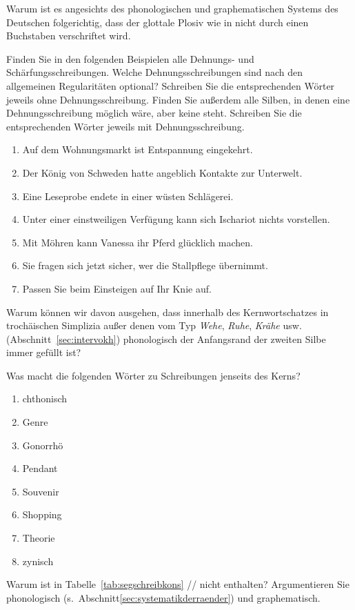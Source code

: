 \Uebung[\tristar] \label{u143} Warum ist es angesichts des phonologischen und graphematischen Systems des Deutschen folgerichtig, dass der glottale Plosiv wie in \textipa{[PEnd@]} nicht durch einen Buchstaben verschriftet wird.

\Uebung \label{u144} Finden Sie in den folgenden Beispielen alle Dehnungs- und Schärfungsschreibungen.
Welche Dehnungsschreibungen sind nach den allgemeinen Regularitäten optional?
Schreiben Sie die entsprechenden Wörter jeweils ohne Dehnungsschreibung.
Finden Sie außerdem alle Silben, in denen eine Dehnungsschreibung möglich wäre, aber keine steht.
Schreiben Sie die entsprechenden Wörter jeweils mit Dehnungsschreibung.

\begin{enumerate}\Lf
  \item Auf dem Wohnungsmarkt ist Entspannung eingekehrt.
  \item Der König von Schweden hatte angeblich Kontakte zur Unterwelt.
  \item Eine Leseprobe endete in einer wüsten Schlägerei.
  \item Unter einer einstweiligen Verfügung kann sich Ischariot nichts vorstellen.
  \item Mit Möhren kann Vanessa ihr Pferd glücklich machen.
  \item Sie fragen sich jetzt sicher, wer die Stallpflege übernimmt.
  \item Passen Sie beim Einsteigen auf Ihr Knie auf. 
\end{enumerate}

\Uebung[\tristar] \label{u145} Warum können wir davon ausgehen, dass innerhalb des Kernwortschatzes in trochäischen Simplizia außer denen vom Typ \textit{Wehe}, \textit{Ruhe}, \textit{Krähe} usw. (Abschnitt~\ref{sec:intervokh}) phonologisch der Anfangsrand der zweiten Silbe immer gefüllt ist?

\Uebung \label{u146} Was macht die folgenden Wörter zu Schreibungen jenseits des Kerns?

\begin{enumerate}\Lf
  \item chthonisch
  \item Genre
  \item Gonorrhö
  \item Pendant
  \item Souvenir
  \item Shopping
  \item Theorie
  \item zynisch
\end{enumerate}

\Uebung[\tristar] \label{u147} Warum ist in Tabelle~\ref{tab:segschreibkons} // nicht enthalten?
Argumentieren Sie phonologisch (s.\ Abschnitt\ref{sec:systematikderraender}) und graphematisch.